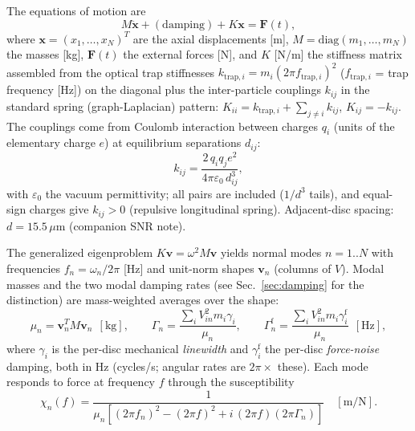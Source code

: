 \documentclass[11pt]{article}
\begin{document}
The equations of motion are
\begin{equation}
  M\ddot{\mathbf{x}} + (\text{damping}) + K\mathbf{x} = \mathbf{F}(t),
  \label{eq:eom}
\end{equation}
where $\mathbf{x}=(x_1,\dots,x_N)^T$ are the axial displacements [m],
$M=\mathrm{diag}(m_1,\dots,m_N)$ the masses [kg], $\mathbf{F}(t)$ the
external forces [N], and $K$ [N/m] the stiffness matrix assembled from
the optical trap stiffnesses $k_{\mathrm{trap},i} = m_i(2\pi
f_{\mathrm{trap},i})^2$ ($f_{\mathrm{trap},i}$ = trap frequency [Hz]) on
the diagonal plus the inter-particle couplings $k_{ij}$ in the standard
spring (graph-Laplacian) pattern: $K_{ii} = k_{\mathrm{trap},i} +
\sum_{j\ne i}k_{ij}$, $K_{ij} = -k_{ij}$. The couplings come from
Coulomb interaction between charges $q_i$ (units of the elementary
charge $e$) at equilibrium separations $d_{ij}$:
\begin{equation}
  k_{ij} = \frac{2\,q_i q_j e^2}{4\pi\varepsilon_0\, d_{ij}^3},
  \label{eq:coulomb}
\end{equation}
with $\varepsilon_0$ the vacuum permittivity; all pairs are included
($1/d^3$ tails), and equal-sign charges give $k_{ij}>0$ (repulsive
longitudinal spring). Adjacent-disc spacing: $d = 15.5\,\mu$m
(companion SNR note).

The generalized eigenproblem $K\mathbf{v} = \omega^2 M\mathbf{v}$ yields
normal modes $n = 1..N$ with frequencies $f_n = \omega_n/2\pi$ [Hz] and
unit-norm shapes $\mathbf{v}_n$ (columns of $V$). Modal masses and the
two modal damping rates (see Sec.~\ref{sec:damping} for the distinction)
are mass-weighted averages over the shape:
\begin{equation}
  \mu_n = \mathbf{v}_n^T M \mathbf{v}_n \ \ [\mathrm{kg}], \qquad
  \Gamma_n = \frac{\sum_i V_{in}^2 m_i \gamma_i}{\mu_n}, \qquad
  \Gamma^{\mathrm{f}}_n =
  \frac{\sum_i V_{in}^2 m_i \gamma^{\mathrm{f}}_i}{\mu_n}
  \ \ [\mathrm{Hz}],
  \label{eq:modal}
\end{equation}
where $\gamma_i$ is the per-disc mechanical \emph{linewidth} and
$\gamma^{\mathrm{f}}_i$ the per-disc \emph{force-noise} damping, both in
Hz (cycles/s; angular rates are $2\pi\times$ these). Each mode responds
to force at frequency $f$ through the susceptibility
\begin{equation}
  \chi_n(f) = \frac{1}
  {\mu_n\!\left[(2\pi f_n)^2 - (2\pi f)^2
      + i\,(2\pi f)(2\pi\Gamma_n)\right]}
  \quad [\mathrm{m/N}].
  \label{eq:chi}
\end{equation}
\end{document}
